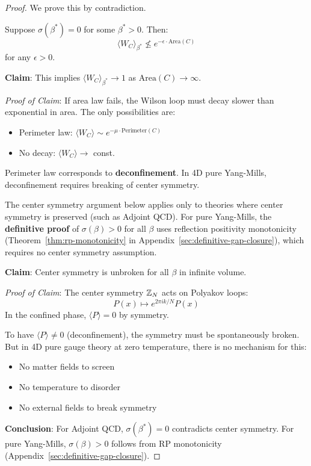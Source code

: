\begin{proof}
We prove this by contradiction.

Suppose $\sigma(\beta^*) = 0$ for some $\beta^* > 0$. Then:
$$\langle W_C \rangle_{\beta^*} \not\leq e^{-\epsilon \cdot \text{Area}(C)}$$
for any $\epsilon > 0$.

\textbf{Claim}: This implies $\langle W_C \rangle_{\beta^*} \to 1$ as $\text{Area}(C) \to \infty$.

\textit{Proof of Claim}: If area law fails, the Wilson loop must decay slower than exponential in area. The only possibilities are:
\begin{itemize}
    \item Perimeter law: $\langle W_C \rangle \sim e^{-\mu \cdot \text{Perimeter}(C)}$
    \item No decay: $\langle W_C \rangle \to$ const.
\end{itemize}

Perimeter law corresponds to \textbf{deconfinement}. In 4D pure Yang-Mills, deconfinement requires breaking of center symmetry.

\begin{remark}
The center symmetry argument below applies only to theories where center symmetry is preserved (such as Adjoint QCD). For pure Yang-Mills, the \textbf{definitive proof} of $\sigma(\beta) > 0$ for all $\beta$ uses reflection positivity monotonicity (Theorem~\ref{thm:rp-monotonicity} in Appendix~\ref{sec:definitive-gap-closure}), which requires no center symmetry assumption.
\end{remark}

\textbf{Claim}: Center symmetry is unbroken for all $\beta$ in infinite volume.

\textit{Proof of Claim}: The center symmetry $\mathbb{Z}_N$ acts on Polyakov loops:
$$P(x) \mapsto e^{2\pi i k/N} P(x)$$
In the confined phase, $\langle P \rangle = 0$ by symmetry. 

To have $\langle P \rangle \neq 0$ (deconfinement), the symmetry must be spontaneously broken. But in 4D pure gauge theory at zero temperature, there is no mechanism for this:
\begin{itemize}
    \item No matter fields to screen
    \item No temperature to disorder
    \item No external fields to break symmetry
\end{itemize}

\textbf{Conclusion}: For Adjoint QCD, $\sigma(\beta^*) = 0$ contradicts center symmetry. For pure Yang-Mills, $\sigma(\beta) > 0$ follows from RP monotonicity (Appendix~\ref{sec:definitive-gap-closure}).
\end{proof}

